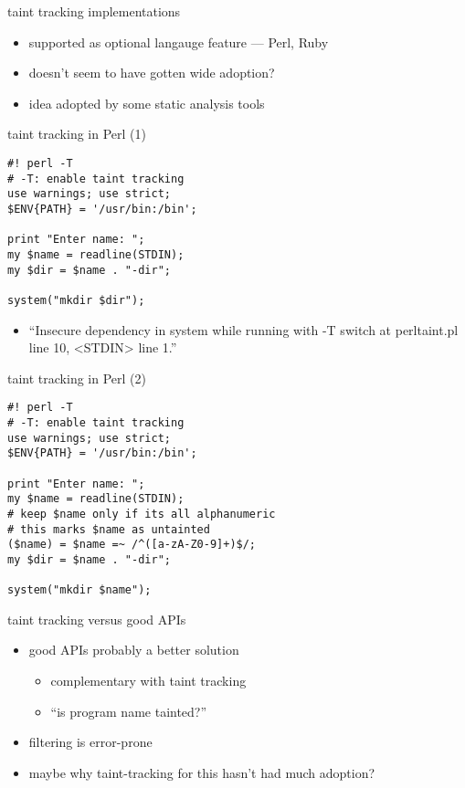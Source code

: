 \begin{frame}{taint tracking implementations}
    \begin{itemize}
        \item supported as optional langauge feature --- Perl, Ruby
        \item doesn't seem to have gotten wide adoption?
        \item idea adopted by some static analysis tools
    \end{itemize}
\end{frame}

\begin{frame}[fragile,label=perlTT1]{taint tracking in Perl (1)}
    \begin{verbatim}
#! perl -T
# -T: enable taint tracking
use warnings; use strict;
$ENV{PATH} = '/usr/bin:/bin';

print "Enter name: ";
my $name = readline(STDIN);
my $dir = $name . "-dir";

system("mkdir $dir");
\end{verbatim}
    \begin{itemize}
    \item ``Insecure dependency in system while running with -T switch at perltaint.pl line 10, <STDIN> line 1.''
    \end{itemize}
\end{frame}

\begin{frame}[fragile,label=perlTT2]{taint tracking in Perl (2)}
\begin{verbatim}
#! perl -T
# -T: enable taint tracking
use warnings; use strict;
$ENV{PATH} = '/usr/bin:/bin';

print "Enter name: ";
my $name = readline(STDIN);
# keep $name only if its all alphanumeric
# this marks $name as untainted
($name) = $name =~ /^([a-zA-Z0-9]+)$/;
my $dir = $name . "-dir";

system("mkdir $name");
\end{verbatim}
\end{frame}

\begin{frame}{taint tracking versus good APIs}
    \begin{itemize}
    \item good APIs probably a better solution
        \begin{itemize}
        \item complementary with taint tracking
        \item ``is program name tainted?''
        \end{itemize}
    \item filtering is error-prone
    \item maybe why taint-tracking for this hasn't had much adoption?
    \end{itemize}
\end{frame}

